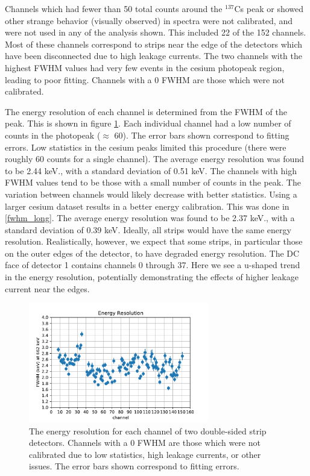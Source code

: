 Channels which had fewer than 50 total counts around the ${}^{137}$Cs peak or showed other strange behavior (visually observed) in spectra were not calibrated, and were not used in any of the analysis shown. This included 22 of the 152 channels. Most of these channels correspond to strips near the edge of the detectors which have been disconnected due to high leakage currents. The two channels with the highest FWHM values had very few events in the cesium photopeak region, leading to poor fitting. Channels with a 0 FWHM are those which were not calibrated.

The energy resolution of each channel is determined from the FWHM of the peak. This is shown in figure \ref{fwhm}. Each individual channel had a low number of counts in the photopeak ($\approx$ 60). The error bars shown correspond to fitting errors. Low statistics in the cesium peaks limited this procedure (there were roughly 60 counts for a single channel). The average energy resolution was found to be 2.44 keV., with a standard deviation of 0.51 keV. The channels with high FWHM values tend to be those with a small number of counts in the peak. The variation between channels would likely decrease with better statistics.  Using a larger cesium dataset results in a better energy calibration. This was done in \ref{fwhm_long}. The average energy resolution was found to be 2.37 keV., with a standard deviation of 0.39 keV. Ideally, all strips would have the same energy resolution. Realistically, however, we expect that some strips, in particular those on the outer edges of the detector, to have degraded energy resolution. The DC face of detector 1 contains channels 0 through 37. Here we see a u-shaped trend in the energy resolution, potentially demonstrating the effects of higher leakage current near the edges.

\begin{figure}
\begin{centering}
\includegraphics[width=0.7\textwidth]{./figures/energy_res.pdf}
\caption{The energy resolution for each channel of two double-sided strip detectors. Channels with a 0 FWHM are those which were not calibrated due to low statistics, high leakage currents, or other issues. The error bars shown correspond to fitting errors.}
\label{fwhm}
\end{centering}
\end{figure}


